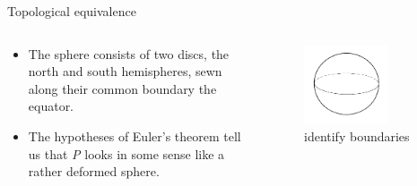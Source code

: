 \documentclass{beamer}
\begin{document}
\begin{frame}{Topological equivalence}
  \begin{columns}
    \begin{column}{0.6\textwidth}
      \begin{block}{}
        \begin{itemize}
        \item The sphere consists of two discs, the north and south hemispheres, sewn along their common boundary the equator.
        \item The hypotheses of Euler's theorem tell us that \textsl{P} looks in some sense like a rather deformed sphere.
        \end{itemize}
      \end{block}
    \end{column}
    \begin{column}{0.4\textwidth}
      \begin{figure}
        \centering
        \includegraphics[width=0.7\textwidth]{figure_1_7_b.png}
        \caption{identify boundaries}
      \end{figure}
    \end{column}
  \end{columns}
\end{frame}
\end{document}
